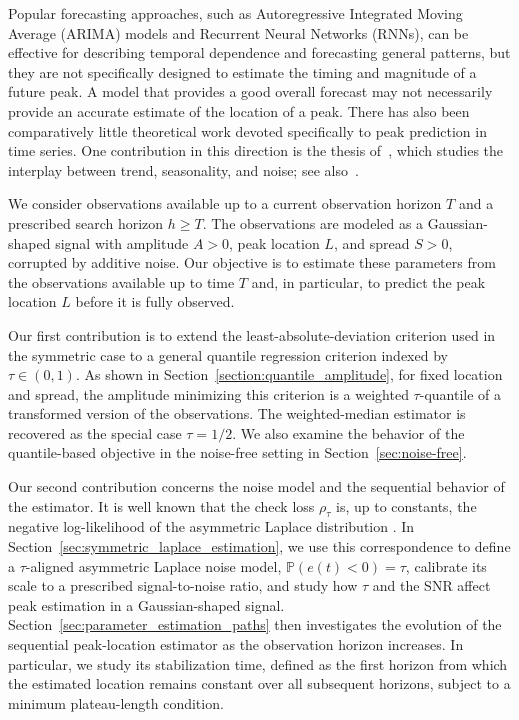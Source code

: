 \documentclass[12pt,a4paper]{article}
\begin{document}
Popular forecasting approaches, such as Autoregressive Integrated Moving
Average (ARIMA) models and Recurrent Neural Networks (RNNs), can be effective
for describing temporal dependence and forecasting general patterns, but they
are not specifically designed to estimate the timing and magnitude of a future
peak. A model that provides a good overall forecast may not necessarily provide
an accurate estimate of the location of a peak. There has also been
comparatively little theoretical work devoted specifically to peak prediction
in time series. One contribution in this direction is the thesis
of~\citet{Tuc20}, which studies the interplay between trend, seasonality, and
noise; see also~\citep{YuB2019,See17}.

We consider observations available up to a current observation horizon \(T\)
and a prescribed search horizon \(h\geq T\). The observations are modeled as a
Gaussian-shaped signal with amplitude \(A>0\), peak location \(L\), and spread
\(S>0\), corrupted by additive noise. Our objective is to estimate these
parameters from the observations available up to time \(T\) and, in particular,
to predict the peak location \(L\) before it is fully observed.

Our first contribution is to extend the least-absolute-deviation criterion used
in the symmetric case to a general quantile regression criterion indexed by
\(\tau\in(0,1)\). As shown in Section~\ref{section:quantile_amplitude}, for
fixed location and spread, the amplitude minimizing this criterion is a
weighted \(\tau\)-quantile of a transformed version of the observations. The
weighted-median estimator is recovered as the special case \(\tau=1/2\). We also
examine the behavior of the quantile-based objective in the noise-free setting
in Section~\ref{sec:noise-free}.

Our second contribution concerns the noise model and the sequential behavior of
the estimator. It is well known that the check loss $\rho_\tau$ is, up to
constants, the negative log-likelihood of the asymmetric Laplace distribution
\citep{Koenker1999,Yu2001}. In
Section~\ref{sec:symmetric_laplace_estimation}, we use this correspondence to
define a $\tau$-aligned asymmetric Laplace noise model, $\mathbb P(e(t)<0)=\tau$,
calibrate its scale to a prescribed signal-to-noise ratio, and study how $\tau$
and the SNR affect peak estimation in a Gaussian-shaped signal.
Section~\ref{sec:parameter_estimation_paths} then investigates the evolution of
the sequential peak-location estimator as the observation horizon increases. In
particular, we study its stabilization time, defined as the first horizon from
which the estimated location remains constant over all subsequent horizons,
subject to a minimum plateau-length condition.
\end{document}
